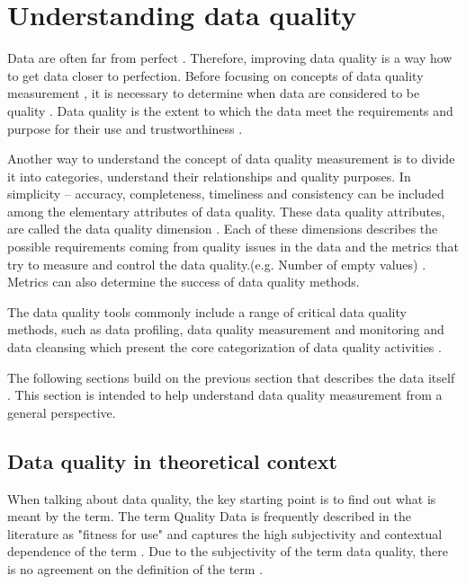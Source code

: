     \section{Understanding data quality}
    \label{sec:understanding_data_quality}
    	
    	Data are often far from perfect . Therefore, improving data quality is a way how to get data closer to perfection. Before focusing on concepts of data quality measurement , it is necessary to determine when data are considered to be quality . Data quality is the extent to which the data meet the requirements and purpose for their use and trustworthiness \cite{McGilvray2008}\cite{Mahanti2018}.
    		  		
    	Another way to understand the concept of data quality measurement is to divide it into categories, understand their relationships and quality purposes. In simplicity -- accuracy, completeness, timeliness and consistency can be included among the elementary attributes of data quality. These data quality attributes, are called the data quality dimension . Each of these dimensions describes the possible requirements coming from quality issues in the data and the metrics that try to measure and control the data quality.(e.g. Number of empty values) \cite{McGilvray2008}. Metrics can also determine the success of data quality methods.
	    
	    The data quality tools  commonly include a range of critical data quality methods, such as data profiling, data quality measurement and monitoring and data cleansing which present the core categorization of data quality activities .
	      
		The following sections build on the previous section that describes the data itself . This section is intended to help understand data quality measurement from a general perspective.
				
		\subsection{Data quality in theoretical context}
		\label{subsec:data_quality_in_theoretical_context}		
		
			When talking about data quality, the key starting point is to find out what is meant by the term. The term Quality Data is frequently described in the literature as "fitness for use" \cite{Elshaer2012} \cite{Ehrlinger2019} and captures the high subjectivity and contextual dependence of the term \cite{Ehrlinger2019}. Due to the subjectivity of the term data quality, there is no agreement on the definition of the term \cite{Elshaer2012}.
			
